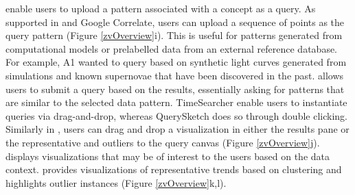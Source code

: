  enable users to upload a pattern associated with a concept as a query. As supported in \zv and Google Correlate, users can upload a sequence of points as the query pattern (Figure \ref{zvOverview}i). This is useful for patterns generated from computational models or prelabelled data from an external reference database. For example, A1 wanted to query based on synthetic light curves generated from simulations and known supernovae that have been discovered in the past. %
 allows users to submit a query based on the results, essentially asking for patterns that are similar to the selected data pattern. TimeSearcher enable users to instantiate queries via drag-and-drop, whereas QuerySketch does so through double clicking. Similarly in \zv, users can drag and drop a visualization in either the results pane or the representative and outliers to the query canvas (Figure \ref{zvOverview}j). 
 displays visualizations that may be of interest to the users based on the data context. \zv provides visualizations of representative trends based on clustering and highlights outlier instances (Figure \ref{zvOverview}k,l).%
